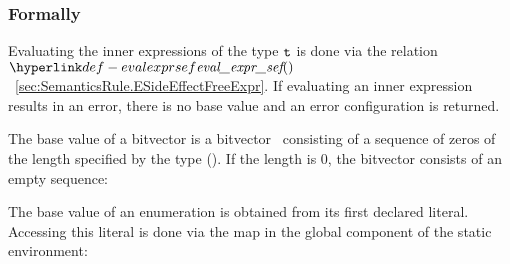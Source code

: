 \subsubsection{Formally}
Evaluating the inner expressions of the type $\vt$ is done via the relation\\
$\evalexprsef$~\ref{sec:SemanticsRule.ESideEffectFreeExpr}.
If evaluating an inner expression results in an error, there is no base value and an error configuration is returned.


The base value of a bitvector is a bitvector \nativevalue\  consisting of a sequence of zeros
of the length specified by the type (\ve). If the length is $0$, the bitvector consists of an
empty sequence:
\begin{mathpar}
\end{mathpar}

\hypertarget{def-constantvalues}{}
The base value of an enumeration is obtained from its first declared literal.
Accessing this literal is done via the \constantvalues map in the
global component of the static environment:
\begin{mathpar}
\end{mathpar}

